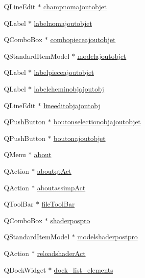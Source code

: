 \begin{DoxyCompactItemize}
\item 
Q\+Line\+Edit $\ast$ \hyperlink{class_main_window_a7deed257fbf9b55e24313b7026170aef}{champnomajoutobjet}
\item 
Q\+Label $\ast$ \hyperlink{class_main_window_a89a46805d840b83d61cde770a96626b8}{labelnomajoutobjet}
\item 
Q\+Combo\+Box $\ast$ \hyperlink{class_main_window_acee7fc52e6b8a7d86b363c0704e6a039}{combopieceajoutobjet}
\item 
Q\+Standard\+Item\+Model $\ast$ \hyperlink{class_main_window_abaf343df783ca19135463902b101a832}{modelajoutobjet}
\item 
Q\+Label $\ast$ \hyperlink{class_main_window_a445babe88ced015f57efc47fb092b2c2}{labelpieceajoutobjet}
\item 
Q\+Label $\ast$ \hyperlink{class_main_window_a4ce532cb101fc4b51f4842e492004a18}{labelcheminobjajoutobj}
\item 
Q\+Line\+Edit $\ast$ \hyperlink{class_main_window_aa760c44de1dda1a9683b3f2c29a8251a}{lineeditobjajoutobj}
\item 
Q\+Push\+Button $\ast$ \hyperlink{class_main_window_a15efafe52bb0d007aeedebbb9689a3af}{boutonselectionobjajoutobjet}
\item 
Q\+Push\+Button $\ast$ \hyperlink{class_main_window_a3371555c180ede0e55ea11a1ce1c9ae9}{boutonajoutobjet}
\item 
Q\+Menu $\ast$ \hyperlink{class_main_window_ab3854d1b008ad18b7d392b767202c802}{about}
\item 
Q\+Action $\ast$ \hyperlink{class_main_window_aa6c9616af83a5c7fa1bcf44204ffb96f}{aboutqt\+Act}
\item 
Q\+Action $\ast$ \hyperlink{class_main_window_afb5ca498bd0c6b89552843980174becd}{aboutassimp\+Act}
\item 
Q\+Tool\+Bar $\ast$ \hyperlink{class_main_window_a0a352c6d66b7a080fcf558874a7e51d4}{file\+Tool\+Bar}
\item 
Q\+Combo\+Box $\ast$ \hyperlink{class_main_window_aeb7af7c08f3408e939c153edc9213ce7}{shaderpospro}
\item 
Q\+Standard\+Item\+Model $\ast$ \hyperlink{class_main_window_abe8e6602c96035cc908b094c3afd70b8}{modelshaderpostpro}
\item 
Q\+Action $\ast$ \hyperlink{class_main_window_af256a212829b94d64480b2e564049577}{reloadshader\+Act}
\item 
Q\+Dock\+Widget $\ast$ \hyperlink{class_main_window_ab0e654c3c8f22ae05433da58c112f155}{dock\+\_\+list\+\_\+elements}
\item 

\end{DoxyCompactItemize}
